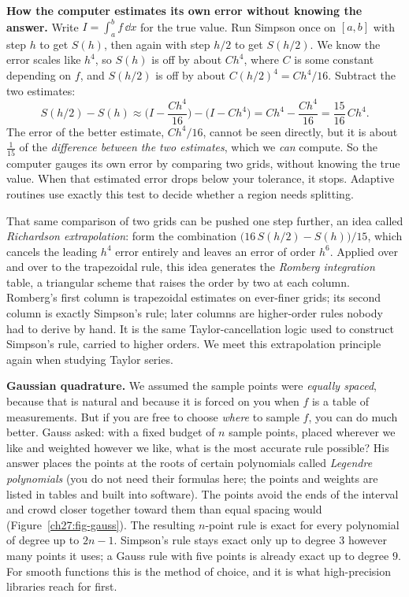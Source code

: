\begin{whybox}
\textbf{How the computer estimates its own error without knowing the answer.} Write $I = \int_a^b f\,\dd x$ for the true value. Run Simpson once on $[a,b]$ with step $h$ to get $S(h)$, then again with step $h/2$ to get $S(h/2)$. We know the error scales like $h^4$, so $S(h)$ is off by about $C h^4$, where $C$ is some constant depending on $f$, and $S(h/2)$ is off by about $C(h/2)^4 = Ch^4/16$. Subtract the two estimates:
\[
S(h/2) - S(h) \approx \Big(I - \frac{Ch^4}{16}\Big) - \big(I - Ch^4\big) = Ch^4 - \frac{Ch^4}{16} = \frac{15}{16}\,Ch^4.
\]
The error of the better estimate, $Ch^4/16$, cannot be seen directly, but it is about $\tfrac{1}{15}$ of the \emph{difference between the two estimates}, which we \emph{can} compute. So the computer gauges its own error by comparing two grids, without knowing the true value. When that estimated error drops below your tolerance, it stops. Adaptive routines use exactly this test to decide whether a region needs splitting.
\end{whybox}

\begin{connectionbox}
That same comparison of two grids can be pushed one step further, an idea called \emph{Richardson extrapolation}: form the combination $\big(16\,S(h/2) - S(h)\big)/15$, which cancels the leading $h^4$ error entirely and leaves an error of order $h^6$. Applied over and over to the trapezoidal rule, this idea generates the \emph{Romberg integration} table, a triangular scheme that raises the order by two at each column. Romberg's first column is trapezoidal estimates on ever-finer grids; its second column is exactly Simpson's rule; later columns are higher-order rules nobody had to derive by hand. It is the same Taylor-cancellation logic used to construct Simpson's rule, carried to higher orders. We meet this extrapolation principle again when studying Taylor series.
\end{connectionbox}

\textbf{Gaussian quadrature.} We assumed the sample points were \emph{equally spaced}, because that is natural and because it is forced on you when $f$ is a table of measurements. But if you are free to choose \emph{where} to sample $f$, you can do much better. Gauss asked: with a fixed budget of $n$ sample points, placed wherever we like and weighted however we like, what is the most accurate rule possible? His answer places the points at the roots of certain polynomials called \emph{Legendre polynomials} (you do not need their formulas here; the points and weights are listed in tables and built into software). The points avoid the ends of the interval and crowd closer together toward them than equal spacing would (Figure~\ref{ch27:fig-gauss}). The resulting $n$-point rule is exact for every polynomial of degree up to $2n-1$. Simpson's rule stays exact only up to degree $3$ however many points it uses; a Gauss rule with five points is already exact up to degree $9$. For smooth functions this is the method of choice, and it is what high-precision libraries reach for first.

